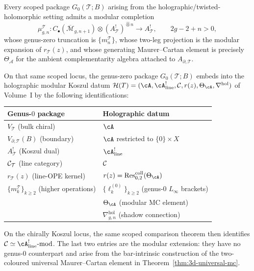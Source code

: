 \begin{conjecture}
\label{conj:modular-completion-package}
\ClaimStatusConjectured
Every scoped package $G_0(\mathcal{T}; B)$ arising from the
holographic/twisted-holomorphic setting admits a modular completion
\[
\mu^{\mathcal{T}}_{g,n} \colon
C_\bullet(\overline{\mathcal{M}}_{g,n+1})
\otimes (A^!_{\mathcal{T}})^{\widehat\otimes n}
\to A^!_{\mathcal{T}},
\qquad 2g - 2 + n > 0,
\]
whose genus-zero truncation is $\{m_n^{\mathcal{T}}\}$, whose
two-leg projection is the modular expansion of
$r_{\mathcal{T}}(z)$, and whose generating Maurer--Cartan element
is precisely $\Theta_{\mathcal{A}}$ for the ambient
complementarity algebra attached to $A_{\partial,\mathcal{T}}$.
\end{conjecture}

\begin{construction}
\label{constr:genus-zero-to-hmkd}
On that same scoped locus, the genus-zero package
$G_0(\mathcal T;B)$ embeds into the
holographic modular Koszul datum
$\mathcal H(T)=(\cA,\cA^!_{\mathrm{line}},\cC,r(z),\Theta_\cA,
\nabla^{\mathrm{hol}})$
of Volume~I
by the following identifications:
\begin{center}
\renewcommand{\arraystretch}{1.15}
\begin{tabular}{ll}
\textbf{Genus-$0$ package} & \textbf{Holographic datum} \\
\hline
$V_\mathcal T$ (bulk chiral)
 & $\cA$ \\
$V_{\partial,\mathcal T}(B)$ (boundary)
 & $\cA$ restricted to $\{0\}\times X$ \\
$A^!_\mathcal T$ (Koszul dual)
 & $\cA^!_{\mathrm{line}}$ \\
$\mathcal C_\mathcal T$ (line category)
 & $\mathcal C$ \\
$r_\mathcal T(z)$ (line-OPE kernel)
 & $r(z)=\operatorname{Res}^{\mathrm{coll}}_{0,2}(\Theta_\cA)$ \\
$\{m_k^\mathcal T\}_{k\ge 2}$ (higher operations)
 & $\{\ell_k^{(0)}\}_{k\ge 2}$ (genus-$0$ $L_\infty$ brackets) \\
{} & $\Theta_\cA$ (modular MC element) \\
{} & $\nabla^{\mathrm{hol}}_{g,n}$ (shadow connection)
\end{tabular}
\end{center}
On the chirally Koszul locus, the same scoped comparison theorem
then identifies $\cC\simeq\cA^!_{\mathrm{line}}\text{-mod}$.
The last two entries are the modular extension: they have no
genus-$0$ counterpart and arise from the bar-intrinsic
construction of the two-coloured universal Maurer--Cartan element in
Theorem~\ref{thm:3d-universal-mc}.


\end{construction}
